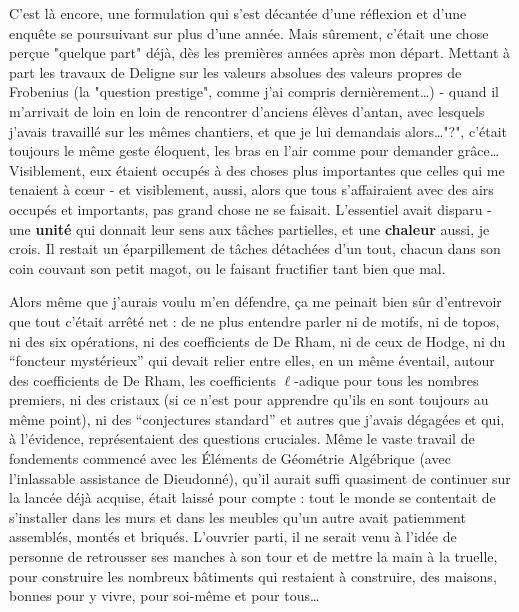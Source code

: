 C'est là encore, une formulation qui s'est décantée d'une réflexion et d'une enquête se poursuivant sur plus d'une année. Mais sûrement, c'était une chose perçue "quelque part" déjà, dès les premières années après mon départ. Mettant à part les travaux de Deligne sur les valeurs absolues des valeurs propres de Frobenius (la "question prestige", comme j'ai compris dernièrement\ldots) - quand il m'arrivait de loin en loin de rencontrer d'anciens élèves d'antan, avec lesquels j'avais travaillé sur les mêmes chantiers, et que je lui demandais alors\ldots "?", c'était toujours le même geste éloquent, les bras en l'air comme pour demander grâce\ldots Visible\-ment, eux étaient occupés à des choses plus importantes que celles qui me tenaient à cœur - et visiblement, aussi, alors que tous s'affairaient avec des airs occupés et importants, pas grand chose ne se faisait. L'essentiel avait disparu - une \textbf{unité} qui donnait leur sens aux tâches partielles, et une \textbf{chaleur} aussi, je crois. Il restait un éparpillement de tâches détachées d'un tout, chacun dans son coin couvant son petit magot, ou le faisant fructifier tant bien que mal.

Alors même que j'aurais voulu m'en défendre, ça me peinait bien sûr d'entrevoir que tout c'était arrêté net : de ne plus entendre parler ni de motifs, ni de topos, ni des six opérations, ni des coefficients de De Rham, ni de ceux de Hodge, ni du ``foncteur mystérieux'' qui devait relier entre elles, en un même éventail, autour des coefficients de De Rham, les coefficients $\ell$-adique pour tous les nombres premiers, ni des cristaux (si ce n'est pour apprendre qu'ils en sont toujours au même point), ni des ``conjectures standard'' et autres que j'avais dégagées et qui, à l'évidence, représentaient des questions cruciales. Même le vaste travail de fondements commencé avec les Éléments de Géométrie Algébrique (avec l'inlassable assistance de Dieudonné), qu'il aurait suffi quasiment de continuer sur la lancée déjà acquise, était laissé pour compte : tout le monde se contentait de s'installer dans les murs et dans les meubles qu'un autre avait patiemment assemblés, montés et briqués. L'ouvrier parti, il ne serait venu à l'idée de personne de retrousser ses manches à son tour et de mettre la main à la truelle, pour construire les nombreux bâtiments qui restaient à construire, des maisons, bonnes pour y vivre, pour soi-même et pour tous\ldots

